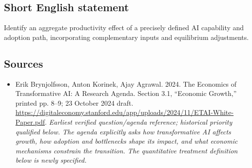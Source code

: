 \documentclass[11pt]{article}
\begin{document}
\subsection{Short English statement}
Identify an aggregate productivity effect of a precisely defined AI capability and adoption path, incorporating complementary inputs and equilibrium adjustments.

\subsection{Sources}
\begin{itemize}\raggedright
\item[\textnormal{[S1]}]\hypertarget{source:30007544:1}{} Erik Brynjolfsson, Anton Korinek, Ajay Agrawal. 2024. The Economics of Transformative AI: A Research Agenda. Section 3.1, “Economic Growth,” printed pp. 8–9; 23 October 2024 draft.
\url{https://digitaleconomy.stanford.edu/app/uploads/2024/11/ETAI-White-Paper.pdf}.
{\small\textit{Earliest verified question/agenda reference; historical priority qualified below. The agenda explicitly asks how transformative AI affects growth, how adoption and bottlenecks shape its impact, and what economic mechanisms constrain the transition. The quantitative treatment definition below is newly specified.}}
\end{itemize}
\end{document}
